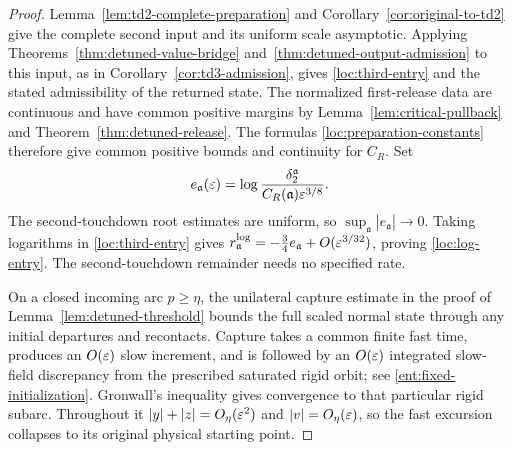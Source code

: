 \begin{proof}
Lemma~\ref{lem:td2-complete-preparation} and
Corollary~\ref{cor:original-to-td2} give the complete second input
and its uniform scale asymptotic. Applying Theorems~\ref{thm:detuned-value-bridge}
and~\ref{thm:detuned-output-admission} to this input, as in
Corollary~\ref{cor:td3-admission}, gives \eqref{loc:third-entry}
and the stated admissibility of the returned state.
The normalized first-release data are continuous and have common
positive margins by Lemma~\ref{lem:critical-pullback} and
Theorem~\ref{thm:detuned-release}. The formulas
\eqref{loc:preparation-constants} therefore give common positive
bounds and continuity for $C_R$. Set
\[
 e_{\mathfrak a}(\varepsilon)
 =\log\frac{\delta_2^{\mathfrak a}}
                 {C_R(\mathfrak a)\varepsilon^{3/8}}.
\]
The second-touchdown root estimates are uniform, so
$\sup_{\mathfrak a}|e_{\mathfrak a}|\to0$.
Taking logarithms in \eqref{loc:third-entry} gives
$r_{\mathfrak a}^{\log}=-\tfrac34 e_{\mathfrak a}
+O(\varepsilon^{3/32})$, proving \eqref{loc:log-entry}.
The second-touchdown remainder needs no specified rate.

On a closed incoming arc $p\ge\eta$, the unilateral capture estimate
in the proof of Lemma~\ref{lem:detuned-threshold} bounds the full scaled normal
state through any initial departures and recontacts. Capture takes
a common finite fast time, produces an $O(\varepsilon)$ slow increment,
and is followed by an $O(\varepsilon)$ integrated slow-field discrepancy
from the prescribed saturated rigid orbit; see
\eqref{ent:fixed-initialization}. Gronwall's inequality gives convergence
to that particular rigid subarc. Throughout it
$|y|+|z|=O_\eta(\varepsilon^2)$ and $|v|=O_\eta(\varepsilon)$, so the fast
excursion collapses to its original physical starting point.


\end{proof}
